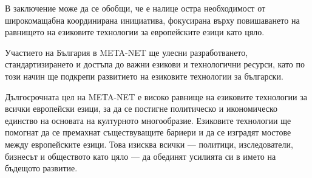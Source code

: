 \documentclass[]{../../metanetpaper}
\begin{document}
\begin{multicols}{2}
В заключение може да се обобщи, че е налице остра необходимост от
широкомащабна координирана инициатива, фокусирана върху повишаването
на равнището на езиковите технологии за европейските езици като цяло.

Участието на България в META-NET ще улесни разработването,
стандартизирането и достъпа до важни езикови и технологични ресурси,
като по този начин ще подкрепи развитието на езиковите технологии за
български.

Дългосрочната цел на META-NET е високо равнище на езиковите технологии
за всички европейски езици, за да се постигне политическо и
икономическо единство на основата на културното
многообразие. Езиковите технологии ще помогнат да се премахнат
съществуващите бариери и да се изградят мостове между европейските
езици. Това изисква всички — политици, изследователи, бизнесът и
обществото като цяло — да обединят усилията си в името на бъдещото
развитие.
\end{multicols}

\clearpage
\end{document}
